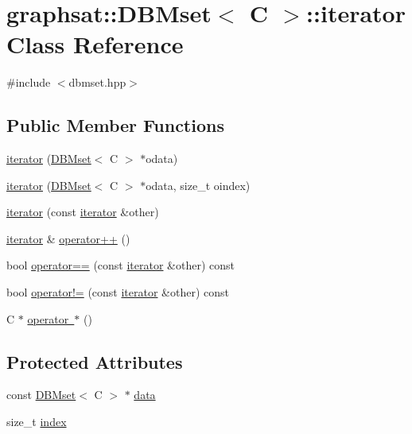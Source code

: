 \hypertarget{classgraphsat_1_1_d_b_mset_1_1iterator}{}\section{graphsat\+::D\+B\+Mset$<$ C $>$\+::iterator Class Reference}
\label{classgraphsat_1_1_d_b_mset_1_1iterator}


{\ttfamily \#include $<$dbmset.\+hpp$>$}

\subsection*{Public Member Functions}
\begin{DoxyCompactItemize}
\item 
\mbox{\hyperlink{classgraphsat_1_1_d_b_mset_1_1iterator_a39375a6f409e03726c70680ecade1c96}{iterator}} (\mbox{\hyperlink{classgraphsat_1_1_d_b_mset}{D\+B\+Mset}}$<$ C $>$ $\ast$odata)
\item 
\mbox{\hyperlink{classgraphsat_1_1_d_b_mset_1_1iterator_a839132c4007560a7eedebd57960aa7df}{iterator}} (\mbox{\hyperlink{classgraphsat_1_1_d_b_mset}{D\+B\+Mset}}$<$ C $>$ $\ast$odata, size\+\_\+t oindex)
\item 
\mbox{\hyperlink{classgraphsat_1_1_d_b_mset_1_1iterator_a9ef8208ccdda6529944521ce796adeac}{iterator}} (const \mbox{\hyperlink{classgraphsat_1_1_d_b_mset_1_1iterator}{iterator}} \&other)
\item 
\mbox{\hyperlink{classgraphsat_1_1_d_b_mset_1_1iterator}{iterator}} \& \mbox{\hyperlink{classgraphsat_1_1_d_b_mset_1_1iterator_a8e2e0cdd973480db0f2f7b98b1ce649c}{operator++}} ()
\item 
bool \mbox{\hyperlink{classgraphsat_1_1_d_b_mset_1_1iterator_a000aeff6a083d09fae95c38696d2dbe1}{operator==}} (const \mbox{\hyperlink{classgraphsat_1_1_d_b_mset_1_1iterator}{iterator}} \&other) const
\item 
bool \mbox{\hyperlink{classgraphsat_1_1_d_b_mset_1_1iterator_a29c0e3f6f9b744414c51a5cff2033a5b}{operator!=}} (const \mbox{\hyperlink{classgraphsat_1_1_d_b_mset_1_1iterator}{iterator}} \&other) const
\item 
C $\ast$ \mbox{\hyperlink{classgraphsat_1_1_d_b_mset_1_1iterator_ad825adc5a116f2637e87325db768d113}{operator $\ast$}} ()
\end{DoxyCompactItemize}
\subsection*{Protected Attributes}
\begin{DoxyCompactItemize}
\item 
const \mbox{\hyperlink{classgraphsat_1_1_d_b_mset}{D\+B\+Mset}}$<$ C $>$ $\ast$ \mbox{\hyperlink{classgraphsat_1_1_d_b_mset_1_1iterator_a48e9559caf425a63e3ebf118339b3e99}{data}}
\item 
size\+\_\+t \mbox{\hyperlink{classgraphsat_1_1_d_b_mset_1_1iterator_a34ea7d7c69007fca88454fa88f8afe49}{index}}
\end{DoxyCompactItemize}


